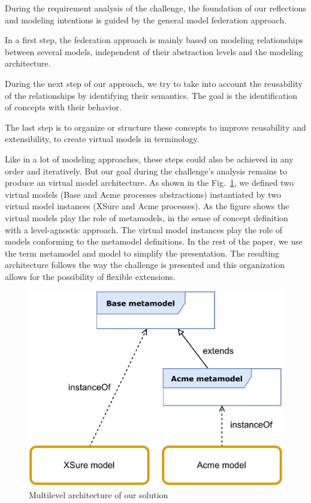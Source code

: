 
During the requirement analysis of the challenge, the foundation of our reflections and modeling intentions is guided by the general model federation approach.

In a first step, the federation approach is mainly based on modeling relationships between several models, independent of their abstraction levels and the modeling architecture.

During the next step of our approach, we try to take into account the reusability of the relationships by identifying their semantics. The goal is the identification of concepts with their behavior.

The last step is to organize or structure these concepts to improve reusability and extensibility, to create virtual models in \FML terminology.

Like in a lot of modeling approaches, these  steps could also be achieved in any order and iteratively. But our goal during the challenge's analysis remains to produce an \FML virtual model architecture.
As shown in the Fig.~\ref{fig:MultilevelArchitecture}, we defined two virtual models (Base and Acme processes abstractions) instantiated by two virtual model instances (XSure and Acme processes). As the figure shows the virtual models play the role of metamodels, in the sense of concept definition with a level-agnostic approach. The virtual model instances play the role of models conforming to the metamodel definitions. In the rest of the paper, we use the term metamodel and model to simplify the presentation.
The resulting architecture follows the way the challenge is presented and this
organization allows for the possibility of flexible extensions.


\begin{figure}[t]
    \centering
    \includegraphics[width=0.8 \columnwidth]{Figures/MultilevelArchitecture-1.5.pdf}
    \caption{Multilevel architecture of our solution}
    \label{fig:MultilevelArchitecture}
\end{figure}

